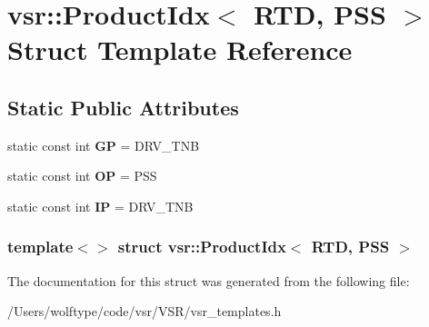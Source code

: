 \hypertarget{structvsr_1_1_product_idx_3_01_r_t_d_00_01_p_s_s_01_4}{\section{vsr\-:\-:Product\-Idx$<$ R\-T\-D, P\-S\-S $>$ Struct Template Reference}
\label{structvsr_1_1_product_idx_3_01_r_t_d_00_01_p_s_s_01_4}
}
\subsection*{Static Public Attributes}
\begin{DoxyCompactItemize}
\item 
\hypertarget{structvsr_1_1_product_idx_3_01_r_t_d_00_01_p_s_s_01_4_a22b63eca2877a2c08f33191375b03177}{static const int {\bfseries G\-P} = D\-R\-V\-\_\-\-T\-N\-B}\label{structvsr_1_1_product_idx_3_01_r_t_d_00_01_p_s_s_01_4_a22b63eca2877a2c08f33191375b03177}

\item 
\hypertarget{structvsr_1_1_product_idx_3_01_r_t_d_00_01_p_s_s_01_4_a7cee686b64bb716ac337182b7b149bcc}{static const int {\bfseries O\-P} = P\-S\-S}\label{structvsr_1_1_product_idx_3_01_r_t_d_00_01_p_s_s_01_4_a7cee686b64bb716ac337182b7b149bcc}

\item 
\hypertarget{structvsr_1_1_product_idx_3_01_r_t_d_00_01_p_s_s_01_4_aad57de70389fcf4cc956193f1daccfe0}{static const int {\bfseries I\-P} = D\-R\-V\-\_\-\-T\-N\-B}\label{structvsr_1_1_product_idx_3_01_r_t_d_00_01_p_s_s_01_4_aad57de70389fcf4cc956193f1daccfe0}

\end{DoxyCompactItemize}
\subsubsection*{template$<$$>$ struct vsr\-::\-Product\-Idx$<$ R\-T\-D, P\-S\-S $>$}



The documentation for this struct was generated from the following file\-:\begin{DoxyCompactItemize}
\item 
/\-Users/wolftype/code/vsr/\-V\-S\-R/vsr\-\_\-templates.\-h\end{DoxyCompactItemize}
